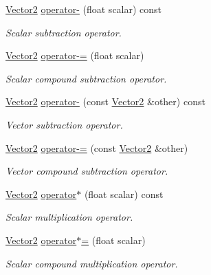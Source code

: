 \begin{DoxyCompactItemize}
\hyperlink{classchaos_1_1gfx_1_1_vector2}{Vector2} \hyperlink{classchaos_1_1gfx_1_1_vector2_a0f4f7749c5841b8ff46b5b60c1114863}{operator-\/} (float scalar) const 
\begin{DoxyCompactList}\small\item\em Scalar subtraction operator. \end{DoxyCompactList}\item 
\hyperlink{classchaos_1_1gfx_1_1_vector2}{Vector2} \hyperlink{classchaos_1_1gfx_1_1_vector2_a658877f9e37d57f11d796b58b870f29f}{operator-\/=} (float scalar)
\begin{DoxyCompactList}\small\item\em Scalar compound subtraction operator. \end{DoxyCompactList}\item 
\hyperlink{classchaos_1_1gfx_1_1_vector2}{Vector2} \hyperlink{classchaos_1_1gfx_1_1_vector2_a5054c54e89586fdf158a5bc82ae3bb7f}{operator-\/} (const \hyperlink{classchaos_1_1gfx_1_1_vector2}{Vector2} \&other) const 
\begin{DoxyCompactList}\small\item\em Vector subtraction operator. \end{DoxyCompactList}\item 
\hyperlink{classchaos_1_1gfx_1_1_vector2}{Vector2} \hyperlink{classchaos_1_1gfx_1_1_vector2_a0d97d413a864a358728a93899446e454}{operator-\/=} (const \hyperlink{classchaos_1_1gfx_1_1_vector2}{Vector2} \&other)
\begin{DoxyCompactList}\small\item\em Vector compound subtraction operator. \end{DoxyCompactList}\item 
\hyperlink{classchaos_1_1gfx_1_1_vector2}{Vector2} \hyperlink{classchaos_1_1gfx_1_1_vector2_a3a082c7e2592573a665f3614af5ecd92}{operator$\ast$} (float scalar) const 
\begin{DoxyCompactList}\small\item\em Scalar multiplication operator. \end{DoxyCompactList}\item 
\hyperlink{classchaos_1_1gfx_1_1_vector2}{Vector2} \hyperlink{classchaos_1_1gfx_1_1_vector2_a1ec390cd7ea976dd0f55067a233b1516}{operator$\ast$=} (float scalar)
\begin{DoxyCompactList}\small\item\em Scalar compound multiplication operator. \end{DoxyCompactList}\item 

\end{DoxyCompactItemize}
